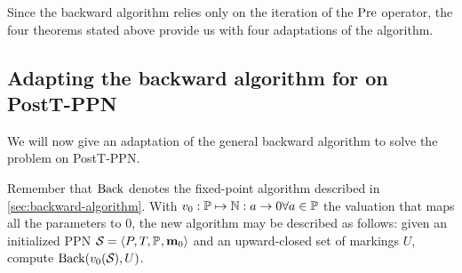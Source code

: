 %
%
%

Since the backward algorithm relies only on the iteration of the $\operatorname{Pre}$ operator, the four theorems stated above provide us with four adaptations of the algorithm.

\subsection{Adapting the backward algorithm for \Ucov on PostT-\ac{PPN}}

We will now give an adaptation of the general backward algorithm to solve the \Ucov problem on PostT-\ac{PPN}.

Remember that $\operatorname{Back}$ denotes the fixed-point algorithm described in \cref{sec:backward-algorithm}.
With $v_0 : \mathbb{P} \mapsto \mathbb{N} : a \rightarrow 0 \forall a \in \mathbb{P}$ the valuation that maps all the parameters to 0, the new algorithm may be described as follows:
given an initialized \ac{PPN} $\defPPN$ and an upward-closed set of markings $U$, compute $\operatorname{Back}(v_0(\mathcal{S}_{{}}), U)$.

